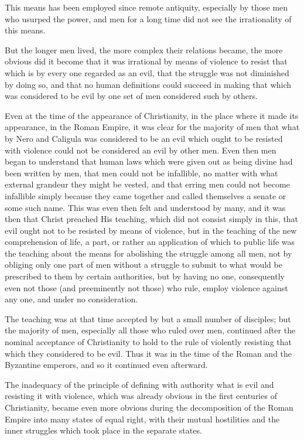 \documentclass{book}
\begin{document}
This means has been employed since remote antiquity, especially by those men who usurped the power, and men for a long time did not see the irrationality of this means.

But the longer men lived, the more complex their relations became, the more obvious did it become that it was irrational by means of violence to resist that which is by every one regarded as an evil, that the struggle was not diminished by doing so, and that no human definitions could succeed in making that which was considered to be evil by one set of men considered such by others.

Even at the time of the appearance of Christianity, in the place where it made its appearance, in the Roman Empire, it was clear for the majority of men that what by Nero and Caligula was considered to be an evil which ought to be resisted with violence could not be considered an evil by other men. Even then men began to understand that human laws which were given out as being divine had been written by men, that men could not be infallible, no matter with what external grandeur they might be vested, and that erring men could not become infallible simply because they came together and called themselves a senate or some such name. This was even then felt and understood by many, and it was then that Christ preached His teaching, which did not consist simply in this, that evil ought not to be resisted by means of violence, but in the teaching of the new comprehension of life, a part, or rather an application of which to public life was the teaching about the means for abolishing the struggle among all men, not by obliging only one part of men without a struggle to submit to what would be prescribed to them by certain authorities, but by having no one, consequently even not those (and preeminently not those) who rule, employ violence against any one, and under no consideration.

The teaching was at that time accepted by but a small number of disciples; but the majority of men, especially all those who ruled over men, continued after the nominal acceptance of Christianity to hold to the rule of violently resisting that which they considered to be evil. Thus it was in the time of the Roman and the Byzantine emperors, and so it continued even afterward.

The inadequacy of the principle of defining with authority what is evil and resisting it with violence, which was already obvious in the first centuries of Christianity, became even more obvious during the decomposition of the Roman Empire into many states of equal right, with their mutual hostilities and the inner struggles which took place in the separate states.
\end{document}
